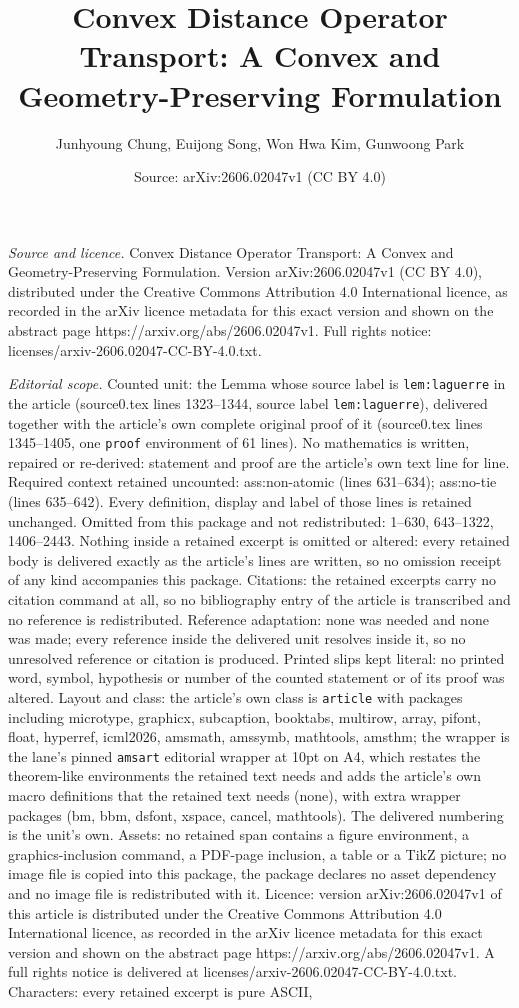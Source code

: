 \documentclass[10pt,a4paper]{amsart}
\title[Convex Distance Operator Transport: A Convex and Geometry-Pr]{Convex Distance Operator Transport: A Convex and Geometry-Preserving Formulation}
\author{Junhyoung Chung, Euijong Song, Won Hwa Kim, Gunwoong Park}
\date{Source: arXiv:2606.02047v1 (CC BY 4.0)}
\begin{document}
\maketitle

\noindent\emph{Source and licence.} Convex Distance Operator Transport: A Convex and Geometry-Preserving Formulation. Version arXiv:2606.02047v1 (CC BY 4.0), distributed under the Creative Commons Attribution 4.0 International licence, as recorded in the arXiv licence metadata for this exact version and shown on the abstract page https://arxiv.org/abs/2606.02047v1. Full rights notice: licenses/arxiv-2606.02047-CC-BY-4.0.txt.\par\smallskip

\noindent\textit{Editorial scope.} Counted unit: the Lemma whose source label is \texttt{lem:laguerre} in the article (source0.tex lines 1323--1344, source label \texttt{lem:laguerre}), delivered together with the article's own complete original proof of it (source0.tex lines 1345--1405, one \texttt{proof} environment of 61 lines). No mathematics is written, repaired or re-derived: statement and proof are the article's own text line for line. Required context retained uncounted: ass:non-atomic (lines 631--634); ass:no-tie (lines 635--642). Every definition, display and label of those lines is retained unchanged. Omitted from this package and not redistributed: 1--630, 643--1322, 1406--2443. Nothing inside a retained excerpt is omitted or altered: every retained body is delivered exactly as the article's lines are written, so no omission receipt of any kind accompanies this package. Citations: the retained excerpts carry no citation command at all, so no bibliography entry of the article is transcribed and no reference is redistributed. Reference adaptation: none was needed and none was made; every reference inside the delivered unit resolves inside it, so no unresolved reference or citation is produced. Printed slips kept literal: no printed word, symbol, hypothesis or number of the counted statement or of its proof was altered. Layout and class: the article's own class is \texttt{article} with packages including microtype, graphicx, subcaption, booktabs, multirow, array, pifont, float, hyperref, icml2026, amsmath, amssymb, mathtools, amsthm; the wrapper is the lane's pinned \texttt{amsart} editorial wrapper at 10pt on A4, which restates the theorem-like environments the retained text needs and adds the article's own macro definitions that the retained text needs (none), with extra wrapper packages (bm, bbm, dsfont, xspace, cancel, mathtools). The delivered numbering is the unit's own. Assets: no retained span contains a figure environment, a graphics-inclusion command, a PDF-page inclusion, a table or a TikZ picture; no image file is copied into this package, the package declares no asset dependency and no image file is redistributed with it. Licence: version arXiv:2606.02047v1 of this article is distributed under the Creative Commons Attribution 4.0 International licence, as recorded in the arXiv licence metadata for this exact version and shown on the abstract page https://arxiv.org/abs/2606.02047v1. A full rights notice is delivered at licenses/arxiv-2606.02047-CC-BY-4.0.txt. Characters: every retained excerpt is pure ASCII, 
\end{document}
